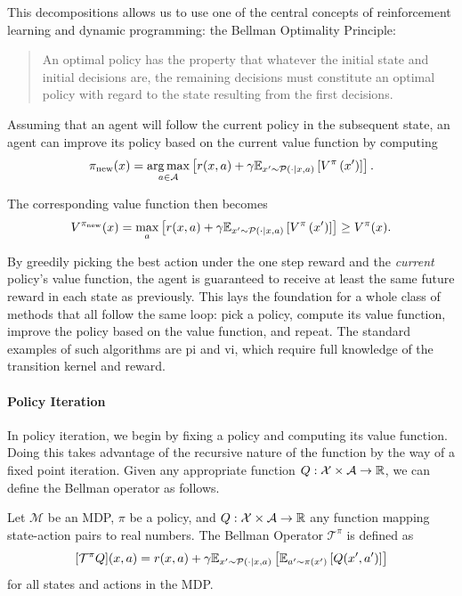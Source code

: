 This decompositions allows us to use one of the central concepts of reinforcement learning and dynamic programming: the Bellman Optimality Principle:
\begin{quote}
    An optimal policy has the property that whatever the initial state and initial decisions are, the remaining decisions must constitute an optimal policy with regard to the state resulting from the first decisions. \parencite{bellman1953}
\end{quote}
Assuming that an agent will follow the current policy in the subsequent state, an agent can improve its policy based on the current value function by computing $$\pi_\mathrm{new}(x) = \operatorname*{arg\,max}_{a \in \mathcal{A}} \left[r(x,a) + \gamma \mathbb{E}_{x'\sim\mathcal{P}(\cdot|x,a)}\left[V^\pi\left(x'\right)\right]\right].$$

The corresponding value function then becomes
$$V^{\pi_\mathrm{new}}(x) = \max_a \left[r(x,a) + \gamma \mathbb{E}_{x'\sim\mathcal{P}(\cdot|x,a)}\left[V^\pi\left(x'\right)\right]\right] \geq V^\pi(x).$$

By greedily picking the best action under the one step reward and the \emph{current} policy's value function, the agent is guaranteed to receive at least the same future reward in each state as previously.
This lays the foundation for a whole class of methods that all follow the same loop: pick a policy, compute its value function, improve the policy based on the value function, and repeat.
The standard examples of such algorithms are \ac{pi} and \ac{vi}, which require full knowledge of the transition kernel and reward.

\paragraph{Policy Iteration}

In policy iteration, we begin by fixing a policy and computing its value function.
Doing this takes advantage of the recursive nature of the function by the way of a fixed point iteration.
Given any appropriate function $Q: \mathcal{X} \times \mathcal{A} \rightarrow \mathbb{R}$, we can define the Bellman operator as follows.

\begin{definition}
    Let $\mathcal{M}$ be an MDP, $\pi$ be a policy, and $Q: \mathcal{X} \times \mathcal{A} \rightarrow \mathbb{R}$ any function mapping state-action pairs to real numbers.
    The Bellman Operator $\mathcal{T}^\pi$ is defined as
    $$[\mathcal{T}^\pi Q](x,a) = r(x,a) + \gamma \mathbb{E}_{x'\sim \mathcal{P}(\cdot|x,a)}\left[\mathbb{E}_{a'\sim\pi(x')}\left[Q(x',a')\right]\right]$$ for all states and actions in the MDP.
\end{definition}

